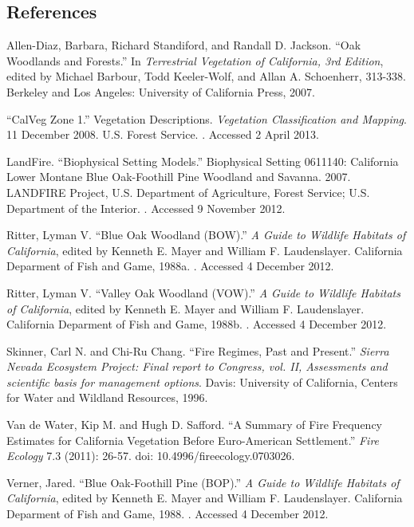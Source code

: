 \clearpage

\subsection*{References}

\begin{hangparas}{.25in}{1} 
Allen-Diaz, Barbara, Richard Standiford, and Randall D. Jackson. ``Oak Woodlands and Forests.'' In \emph{Terrestrial Vegetation of California, 3rd Edition}, edited by Michael Barbour, Todd Keeler-Wolf, and Allan A. Schoenherr, 313-338. Berkeley and Los Angeles: University of California Press, 2007. 

``CalVeg Zone 1.'' Vegetation Descriptions. \emph{Vegetation Classification and Mapping}.  11 December 2008. U.S. Forest Service. . Accessed 2 April 2013.

LandFire. ``Biophysical Setting Models.'' Biophysical Setting 0611140: California Lower Montane Blue Oak-Foothill Pine Woodland and Savanna. 2007. LANDFIRE Project, U.S. Department of Agriculture, Forest Service; U.S. Department of the Interior. . Accessed 9 November 2012.

Ritter, Lyman V. ``Blue Oak Woodland (BOW).'' \emph{A Guide to Wildlife Habitats of California}, edited by Kenneth E. Mayer and William F. Laudenslayer. California Deparment of Fish and Game, 1988a. . Accessed 4 December 2012.

Ritter, Lyman V. ``Valley Oak Woodland (VOW).'' \emph{A Guide to Wildlife Habitats of California}, edited by Kenneth E. Mayer and William F. Laudenslayer. California Deparment of Fish and Game, 1988b. . Accessed 4 December 2012.

Skinner, Carl N. and Chi-Ru Chang. ``Fire Regimes, Past and Present.'' \emph{Sierra Nevada Ecosystem Project: Final report to Congress, vol. II, Assessments and scientific basis for management options}. Davis: University of California, Centers for Water and Wildland Resources, 1996.

Van de Water, Kip M. and Hugh D. Safford. ``A Summary of Fire Frequency Estimates for California Vegetation Before Euro-American Settlement.'' \emph{Fire Ecology} 7.3 (2011): 26-57. doi: 10.4996/fireecology.0703026.

Verner, Jared. ``Blue Oak-Foothill Pine (BOP).'' \emph{A Guide to Wildlife Habitats of California}, edited by Kenneth E. Mayer and William F. Laudenslayer. California Deparment of Fish and Game, 1988. . Accessed 4 December 2012. 

\end{hangparas}


